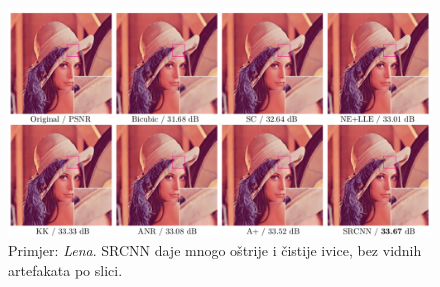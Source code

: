 \documentclass[12pt]{report}
\newtheorem{defn}{Definicija}[chapter]
\newtheorem{thm}{Teorema}[chapter]
\newtheorem{cor}{Posljedica}[chapter]
\numberwithin{equation}{section}
\begin{document}
\newpage


 
 
\begin{figure}
\centering
\includegraphics[scale=0.45]{SLIKE/lena}
\caption{Primjer: \textit{Lena}. SRCNN daje mnogo oštrije i čistije ivice, bez vidnih artefakata po slici.}
\label{fig:primjer}
\end{figure} 
 
 
  





\end{document}
